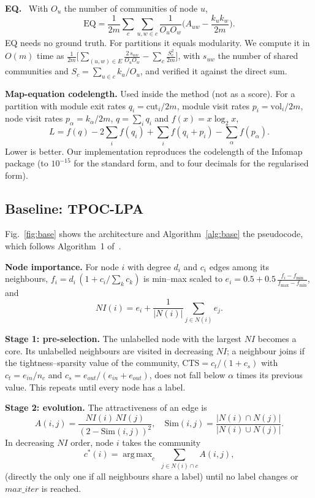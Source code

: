 \documentclass[conference]{IEEEtran}
\DeclareMathOperator*{\argmax}{arg\,max}
\begin{document}
\textbf{EQ.}~\cite{shen2009} With $O_u$ the number of communities of node $u$,
\begin{equation}
\mathrm{EQ}=\frac1{2m}\sum_c\sum_{u,w\in c}\frac{1}{O_uO_w}\Big(A_{uw}-\frac{k_uk_w}{2m}\Big).\label{eq:eq}
\end{equation}
EQ needs no ground truth. For partitions it equals modularity. We compute it in $O(m)$ time as $\frac1{2m}\big[\sum_{(u,w)\in E}\frac{2\,s_{uw}}{O_uO_w}-\sum_c\frac{S_c^2}{2m}\big]$, with $s_{uw}$ the number of shared communities and $S_c=\sum_{u\in c}k_u/O_u$, and verified it against the direct sum.

\textbf{Map-equation codelength.} Used inside the method (not as a score). For a partition with module exit rates $q_i=\mathrm{cut}_i/2m$, module visit rates $p_i=\mathrm{vol}_i/2m$, node visit rates $p_\alpha=k_\alpha/2m$, $q=\sum_iq_i$ and $f(x)=x\log_2x$,
\begin{equation}
L=f(q)-2\sum_if(q_i)+\sum_if(q_i+p_i)-\sum_\alpha f(p_\alpha).\label{eq:L}
\end{equation}
Lower is better. Our implementation reproduces the codelength of the Infomap package (to $10^{-15}$ for the standard form, and to four decimals for the regularised form).

\subsection{Baseline: TPOC-LPA}\label{sec:base}
Fig.~\ref{fig:base} shows the architecture and Algorithm~\ref{alg:base} the pseudocode, which follows Algorithm~1 of~\cite{kong2026}. 

\textbf{Node importance.} For node $i$ with degree $d_i$ and $c_i$ edges among its neighbours, $f_i=d_i\,(1+c_i/\sum_kc_k)$ is min--max scaled to $e_i=0.5+0.5\,\frac{f_i-f_{\min}}{f_{\max}-f_{\min}}$, and
\begin{equation}
NI(i)=e_i+\frac1{|N(i)|}\sum_{j\in N(i)}e_j.\label{eq:ni}
\end{equation}

\textbf{Stage 1: pre-selection.} The unlabelled node with the largest $NI$ becomes a core. Its unlabelled neighbours are visited in decreasing $NI$; a neighbour joins if the tightness--sparsity value of the community, $\mathrm{CTS}=c_t/(1+c_s)$ with $c_t=e_{in}/n_c$ and $c_s=e_{out}/(e_{in}+e_{out})$, does not fall below $\alpha$ times its previous value. This repeats until every node has a label.

\textbf{Stage 2: evolution.} The attractiveness of an edge is
\begin{equation}
A(i,j)=\frac{NI(i)\,NI(j)}{(2-\mathrm{Sim}(i,j))^2},\quad \mathrm{Sim}(i,j)=\frac{|N(i)\cap N(j)|}{|N(i)\cup N(j)|}.\label{eq:A}
\end{equation}
In decreasing $NI$ order, node $i$ takes the community
\begin{equation}
c^{*}(i)=\argmax_{c}\;\sum_{j\in N(i)\cap c}A(i,j),\label{eq:stage2}
\end{equation}
(directly the only one if all neighbours share a label) until no label changes or $max\_iter$ is reached.
\end{document}
